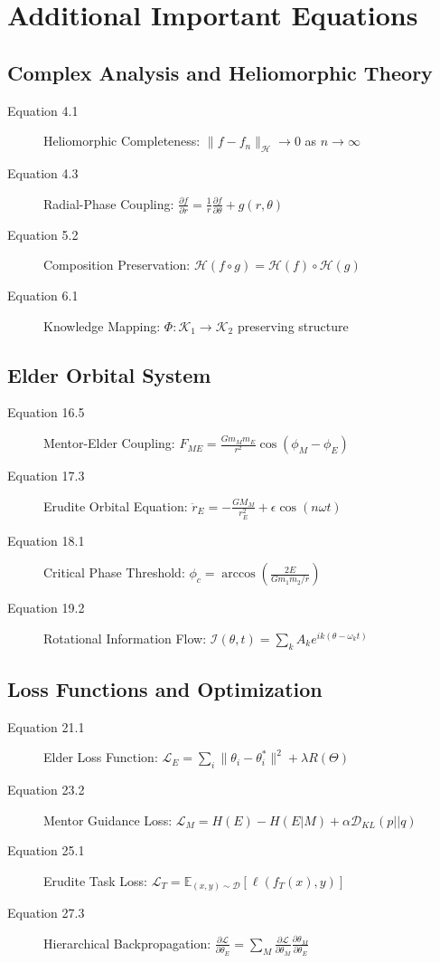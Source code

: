 \section{Additional Important Equations}

\subsection{Complex Analysis and Heliomorphic Theory}

\begin{description}
\item[Equation 4.1] Heliomorphic Completeness: $\|f - f_n\|_{\mathcal{H}} \to 0$ as $n \to \infty$
\item[Equation 4.3] Radial-Phase Coupling: $\frac{\partial f}{\partial r} = \frac{1}{r}\frac{\partial f}{\partial \theta} + g(r,\theta)$
\item[Equation 5.2] Composition Preservation: $\mathcal{H}(f \circ g) = \mathcal{H}(f) \circ \mathcal{H}(g)$
\item[Equation 6.1] Knowledge Mapping: $\Phi: \mathcal{K}_1 \rightarrow \mathcal{K}_2$ preserving structure
\end{description}

\subsection{Elder Orbital System}

\begin{description}
\item[Equation 16.5] Mentor-Elder Coupling: $F_{ME} = \frac{G m_M m_E}{r^2} \cos(\phi_M - \phi_E)$
\item[Equation 17.3] Erudite Orbital Equation: $\ddot{r}_E = -\frac{GM_M}{r_E^2} + \epsilon \cos(n\omega t)$
\item[Equation 18.1] Critical Phase Threshold: $\phi_c = \arccos\left(\frac{2E}{G m_1 m_2/r}\right)$
\item[Equation 19.2] Rotational Information Flow: $\mathcal{I}(\theta, t) = \sum_k A_k e^{ik(\theta - \omega_k t)}$
\end{description}

\subsection{Loss Functions and Optimization}

\begin{description}
\item[Equation 21.1] Elder Loss Function: $\mathcal{L}_E = \sum_i \|\theta_i - \theta_i^*\|^2 + \lambda R(\Theta)$
\item[Equation 23.2] Mentor Guidance Loss: $\mathcal{L}_M = H(E) - H(E|M) + \alpha \mathcal{D}_{KL}(p||q)$
\item[Equation 25.1] Erudite Task Loss: $\mathcal{L}_T = \mathbb{E}_{(x,y) \sim \mathcal{D}}[\ell(f_T(x), y)]$
\item[Equation 27.3] Hierarchical Backpropagation: $\frac{\partial \mathcal{L}}{\partial \theta_E} = \sum_M \frac{\partial \mathcal{L}}{\partial \theta_M} \frac{\partial \theta_M}{\partial \theta_E}$
\end{description}

